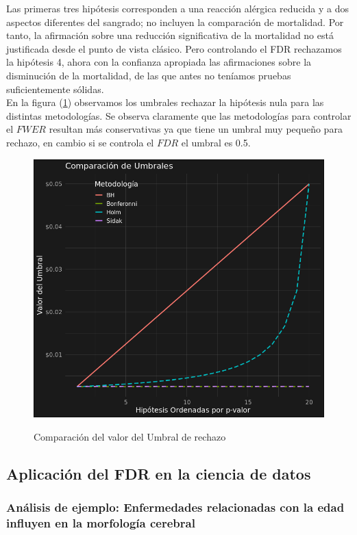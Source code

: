 \documentclass[11pt,letterpaper]{article}
\begin{document}
Las primeras tres hipótesis corresponden a una reacción alérgica reducida y a dos aspectos diferentes del sangrado; no incluyen la comparación de mortalidad. Por tanto, la afirmación sobre una reducción significativa de la mortalidad no está justificada desde el punto de vista clásico. Pero controlando el FDR rechazamos la hipótesis 4,  ahora con la confianza apropiada las afirmaciones sobre la disminución de la mortalidad, de las que antes no teníamos pruebas suficientemente sólidas.\\

En la figura  (\ref{comparacion_métodos}) observamos los umbrales rechazar la hipótesis nula  para las distintas metodologías. Se observa claramente que las metodologías para controlar el $FWER$ resultan más conservativas ya que tiene un umbral muy pequeño para rechazo, en cambio si se controla el $FDR$ el umbral es 0.5.
\begin{figure}[H]
\centering \label{comparacion_métodos}
\includegraphics[scale=.5]{comparacion_de_metodos.png}
\caption{Comparación del valor del Umbral de rechazo}
\end{figure}

\subsection{Aplicación del FDR en la ciencia de datos}
\subsubsection{Análisis de ejemplo: Enfermedades relacionadas con la edad influyen en la morfología cerebral}
\end{document}
